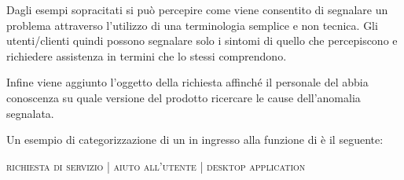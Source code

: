 Dagli esempi sopracitati si può percepire come viene consentito di segnalare un problema attraverso l'utilizzo di una terminologia semplice e non tecnica. Gli utenti/clienti quindi possono segnalare solo i sintomi di quello che percepiscono e richiedere assistenza in termini che lo stessi comprendono.

Infine viene aggiunto l'oggetto  della richiesta affinché il personale del  abbia conoscenza su quale versione del prodotto ricercare le cause dell'anomalia segnalata.

Un esempio di categorizzazione di un  in ingresso alla funzione di  è il seguente:

\begin{center}
\textsc{richiesta di servizio} | \textsc{aiuto all'utente} | \textsc{desktop application}
\end{center}